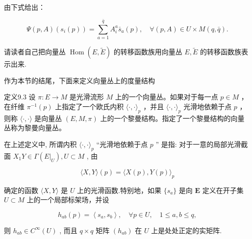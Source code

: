 由下式给出：

$$
\Psi (p, A) (s _ {i} (p)) = \sum_ {a = 1} ^ {\bar {q}} A _ {i} ^ {a} \bar {s} _ {a} (p), \quad \forall (p, A) \in U \times M (q, \bar {q}).
$$

请读者自己把向量丛  $\operatorname{Hom}(E, \tilde{E})$  的转移函数族用向量丛  $E, \tilde{E}$  的转移函数族表示出来.

作为本节的结尾，下面来定义向量丛上的度量结构

定义9.3 设  $\pi: E \to M$  是光滑流形  $M$  上的一个向量丛。如果对于每一点  $p \in M$ ，在纤维  $\pi^{-1}(p)$  上指定了一个欧氏内积  $\langle \cdot, \cdot \rangle_{p}$ ，并且  $\langle \cdot, \cdot \rangle_{p}$  光滑地依赖于点  $p$ ，则称  $\langle \cdot, \cdot \rangle$  是向量丛  $(E, M, \pi)$  上的一个黎曼结构。指定了一个黎曼结构的向量丛称为黎曼向量丛。

在上述定义中, 所谓内积  $\langle \cdot, \cdot \rangle_{p}$  “光滑地依赖于点  $p$ ” 是指: 对于一意的局部光滑截面  $X_{1}Y \in \Gamma(E|_{U}), U \subset M$ , 由

$$
\langle X, Y \rangle (p) = \langle X (p), Y (p) \rangle_ {p}
$$

确定的函数  $\langle X,Y\rangle$  是  $U$  上的光滑函数.特别地，如果  $\{s_a\}$  是向  $\pmb{E}$  定义在开子集  $U\subset M$  上的一个局部标架场，并设

$$
h _ {a b} (p) = \left\langle s _ {a}, s _ {b} \right\rangle , \quad \forall p \in U, \quad 1 \leqslant a, b \leqslant q,
$$

则  $h_{ab} \in C^{\infty}(U)$ , 而且  $q \times q$  矩阵  $(h_{ab})$  在  $U$  上是处处正定的实矩阵.